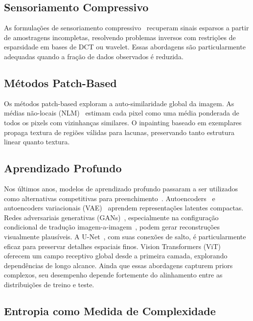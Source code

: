 \subsection{Sensoriamento Compressivo}

As formulações de sensoriamento compressivo~\cite{donoho2006compressed,candes2006robust} recuperam sinais esparsos a partir de amostragens incompletas, resolvendo problemas inversos com restrições de esparsidade em bases de DCT ou wavelet. Essas abordagens são particularmente adequadas quando a fração de dados observados é reduzida.

\subsection{Métodos Patch-Based}

Os métodos patch-based exploram a auto-similaridade global da imagem. As médias não-locais (NLM)~\cite{buades2005non} estimam cada pixel como uma média ponderada de todos os pixels com vizinhanças similares. O inpainting baseado em exemplares~\cite{criminisi2004region} propaga textura de regiões válidas para lacunas, preservando tanto estrutura linear quanto textura.

\subsection{Aprendizado Profundo}

Nos últimos anos, modelos de aprendizado profundo passaram a ser utilizados como alternativas competitivas para preenchimento~\cite{zhang2018missing}. Autoencoders~\cite{hinton2006reducing} e autoencoders variacionais (VAE)~\cite{kingma2014auto} aprendem representações latentes compactas. Redes adversariais generativas (GANs)~\cite{goodfellow2014generative}, especialmente na configuração condicional de tradução imagem-a-imagem~\cite{isola2017image}, podem gerar reconstruções visualmente plausíveis. A U-Net~\cite{ronneberger2015unet}, com suas conexões de salto, é particularmente eficaz para preservar detalhes espaciais finos. Vision Transformers (ViT)~\cite{dosovitskiy2021image} oferecem um campo receptivo global desde a primeira camada, explorando dependências de longo alcance. Ainda que essas abordagens capturem priors complexos, seu desempenho depende fortemente do alinhamento entre as distribuições de treino e teste.

\subsection{Entropia como Medida de Complexidade}

